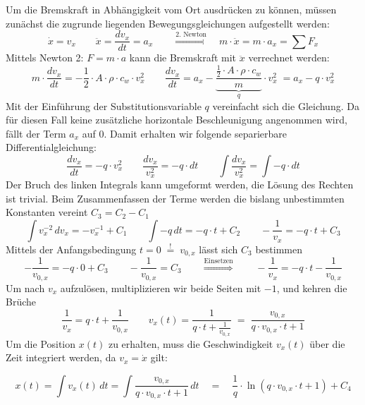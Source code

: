 Um die Bremskraft in Abhängigkeit vom Ort ausdrücken zu können, müssen zunächst die zugrunde liegenden Bewegungsgleichungen aufgestellt werden:
\[
\dot{x} = v_x \qquad
\ddot{x} = \frac{dv_x}{dt} = a_x \qquad
\overset{\text{2. Newton}}{\Longrightarrow} \quad
m\cdot \ddot{x} = m\cdot a_x = \sum F_x
\]
Mittels Newton 2: $F=m\cdot a$ kann die Bremskraft mit $\ddot{x}$ verrechnet werden:
\label{sec:fall_vier_ax}
\[
m \cdot \frac{dv_x}{dt} = -\frac{1}{2} \cdot A \cdot \rho \cdot c_w \cdot v_x^2 \qquad \frac{dv_x}{dt}= a_x -\underbrace{\frac{\frac{1}{2} \cdot A \cdot \rho \cdot c_w}{m}}_{q} \cdot v_x^2 \; = a_x-q\cdot v_x^2
\]
Mit der Einführung der Substitutionsvariable $q$ vereinfacht sich die Gleichung. 
Da für diesen Fall keine zusätzliche horizontale Beschleunigung angenommen wird, fällt der Term $a_x$ auf $0$. Damit erhalten wir folgende separierbare Differentialgleichung:
\[
\frac{dv_x}{dt} = -q \cdot v_x^2 \qquad \frac{dv_x}{v_x^2} = -q \cdot dt \qquad \int \frac{dv_x}{v_x^2} = \int -q \cdot dt
\]
Der Bruch des linken Integrals kann umgeformt werden, die Lösung des Rechten ist trivial. Beim Zusammenfassen der Terme werden die bislang unbestimmten Konstanten vereint $C_3 = C_2 - C_1$ 
\[
\int v_x^{-2} \, dv_x = -v_x^{-1} + C_1 \qquad \int -q \, dt = -q \cdot t + C_2 \qquad -\frac{1}{v_x} = -q \cdot t + C_3
\]
Mittels der Anfangsbedingung $t = 0 \; \overset{!}{=} \; v_{0,x}$ lässt sich $C_3$ bestimmen
\[
-\frac{1}{v_{0,x}} = -q \cdot 0 + C_3 \qquad -\frac{1}{v_{0,x}} = C_3 \qquad \overset{\text{Einsetzen}}{\Longrightarrow} \qquad -\frac{1}{v_x} = -q \cdot t - \frac{1}{v_{0,x}}
\]
Um nach $v_x$ aufzulösen, multiplizieren wir beide Seiten mit $-1$, und kehren die Brüche
\[
\frac{1}{v_x} = q \cdot t + \frac{1}{v_{0,x}} \qquad v_x(t) = \frac{1}{q \cdot t + \frac{1}{v_{0,x}}} \; = \; \frac{v_{0,x}}{q \cdot v_{0,x} \cdot t + 1}
\]
Um die Position $x(t)$ zu erhalten, muss die Geschwindigkeit $v_x(t)$ über die Zeit integriert werden, da $v_x = \dot{x}$ gilt:

\[
x(t) = \int v_x(t) \, dt = \int \frac{v_{0,x}}{q \cdot v_{0,x} \cdot t + 1}\, dt \quad = \quad \frac{1}{q}\cdot \ln\left(q \cdot v_{0,x} \cdot t+1\right) + C_4
\]
